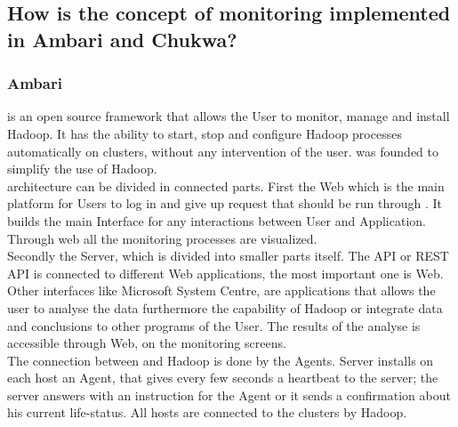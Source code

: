 \subsection{How is the concept of monitoring implemented in Ambari and Chukwa?}
\label{subsec:Implementation}

\subsubsection{Ambari}
\amb is an open source framework that allows the User to monitor, manage and install Hadoop.\cite{ChukwaPoster} It has the ability to start, stop and configure Hadoop processes automatically on clusters, without any intervention of the user.\cite{Hortonworks2013} \amb was founded to simplify the use of Hadoop.\cite{Hortonworks2013}
\\
\amb architecture can be divided in connected parts. First the \amb Web which is the main platform for Users to log in and give up request that should be run through \amb.\cite{Sako} It builds the main Interface for any interactions between User and Application.\cite{Sako} Through \amb web all the monitoring processes are visualized. 
\\
Secondly the \amb Server, which is divided into smaller parts itself.\cite{Sako} The API or REST API is connected to different Web applications, the most important one is \amb Web.\cite{Sako} Other interfaces like Microsoft System Centre, are applications that allows the user to analyse the data furthermore the capability of Hadoop or integrate data and conclusions to other programs of the User.\cite{Hortonworks2013} The results of the analyse is accessible through \amb Web, on the monitoring screens.\cite{Sako}
\\
The connection between \amb and Hadoop is done by the \amb Agents.\cite{Sako} \amb Server installs on each host an \amb Agent, that gives every few seconds a heartbeat to the server; the server answers with an instruction for the Agent or it sends a confirmation about his current life-status.\cite{Sako} All hosts are connected to the clusters by Hadoop.\cite{Sako}
\\
